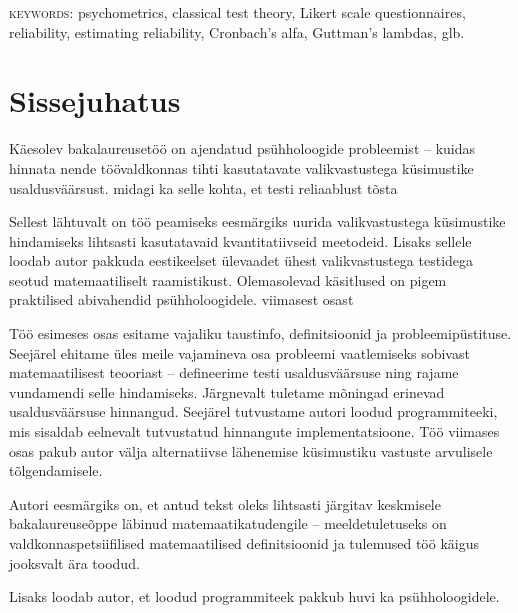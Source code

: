 \documentclass[a4paper,12pt,oneside]{article}
\numberwithin{equation}{section}
\theoremstyle{definition}
\begin{document}
\textsc{keywords:}  psychometrics, classical test theory, Likert scale questionnaires, reliability, estimating reliability, Cronbach's alfa, Guttman's lambdas, glb.

\pagebreak


\tableofcontents

\pagebreak

\section*{Sissejuhatus}

Käesolev bakalaureusetöö on ajendatud psühholoogide probleemist -- kuidas \linebreak hinnata nende töövaldkonnas tihti kasutatavate valikvastustega küsimustike usaldusväärsust. {\color{red} midagi ka selle kohta, et testi reliaablust tõsta}

Sellest lähtuvalt on töö peamiseks eesmärgiks uurida valikvastustega küsimustike hindamiseks lihtsasti kasutatavaid kvantitatiivseid meetodeid. Lisaks sellele loodab autor pakkuda eestikeelset ülevaadet ühest valikvastustega testidega seotud matemaatiliselt raamistikust. Olemasolevad käsitlused on pigem praktilised abivahendid psühholoogidele. 
{\color{red}viimasest osast}

Töö esimeses osas esitame vajaliku taustinfo, definitsioonid ja probleemipüstituse. Seejärel ehitame üles meile vajamineva osa probleemi vaatlemiseks sobivast matemaatilisest teooriast -- defineerime testi usaldusväärsuse ning rajame vundamendi selle hindamiseks. Järgnevalt tuletame mõningad erinevad usaldusväärsuse hinnangud. Seejärel tutvustame autori loodud programmiteeki, mis sisaldab eelnevalt tutvustatud hinnangute implementatsioone. Töö viimases osas pakub autor välja alternatiivse lähenemise küsimustiku vastuste arvulisele tõlgendamisele.

Autori eesmärgiks on, et antud tekst oleks lihtsasti järgitav keskmisele bakalaureuseõppe läbinud matemaatikatudengile -- meeldetuletuseks on valdkonnaspetsiifilised matemaatilised definitsioonid ja tulemused töö käigus jooksvalt ära \linebreak toodud. 

Lisaks loodab autor, et loodud programmiteek pakkub huvi ka psühholoogidele. 






\pagebreak
\end{document}
